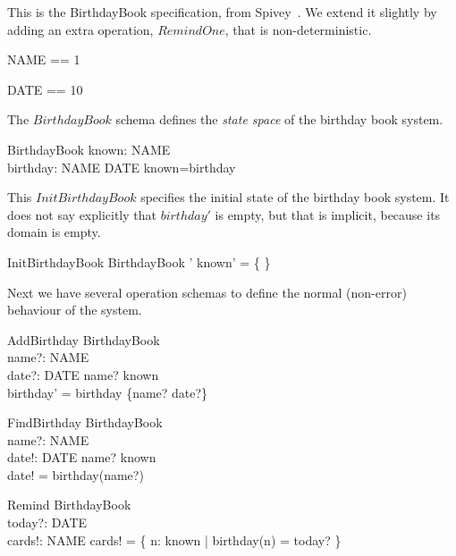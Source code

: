 \documentclass{article}
\begin{document}
This is the BirthdayBook specification, from 
Spivey~\cite{spivey:z-notation2}.  We extend it slightly
by adding an extra operation, $RemindOne$, that is non-deterministic.

\begin{zed}
   NAME == 1 
\end{zed}
\begin{zed}
   DATE == 10 
\end{zed}

The $BirthdayBook$ schema defines the \emph{state space} of 
the birthday book system. 

\begin{schema}{BirthdayBook}
    known: \power NAME \\
    birthday: NAME \pfun DATE
\where
    known=\dom birthday
\end{schema}

This $InitBirthdayBook$ specifies the initial state
of the birthday book system.  It does not say explicitly that
$birthday'$ is empty, but that is implicit, because its domain
is empty.

\begin{schema}{InitBirthdayBook}
    BirthdayBook '
\where
    known' = \{ \}
\end{schema}

Next we have several operation schemas to define the normal (non-error)
behaviour of the system.

\begin{schema}{AddBirthday}
    \Delta BirthdayBook \\
    name?: NAME \\
    date?: DATE
\where
    name? \notin known
\\
    birthday' = birthday \cup \{name? \mapsto date?\}
\end{schema}

\begin{schema}{FindBirthday}
    \Xi BirthdayBook \\
    name?: NAME \\
    date!: DATE 
\where
    name? \in known
\\
    date! = birthday(name?)
\end{schema}

\begin{schema}{Remind}
    \Xi BirthdayBook \\
    today?: DATE \\
    cards!: \power NAME
\where
    cards! = \{ n: known | birthday(n) = today? \}
\end{schema}
\end{document}
